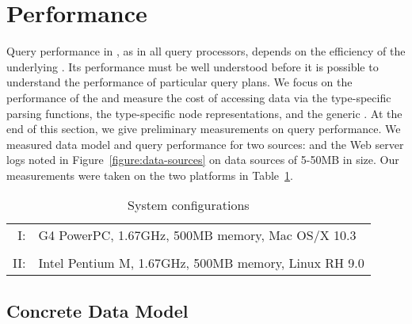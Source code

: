 \section{Performance}
\label{section:performance}

Query performance in \padx{}, as in all query processors, depends on
the efficiency of the underlying \condm{}.  Its performance must be
well understood before it is possible to understand the performance of
particular query plans. We focus on the performance of the \condm{}
and measure the cost of accessing data via the \pads{} type-specific parsing
functions, the \padx{} type-specific node representations, and the
generic \padx{} \condm{}.  At the end of this section, we give preliminary
measurements on query performance.  We measured data model and query
performance for two \pads{} sources: \dibbler{} and the Web server
logs noted in Figure~\ref{figure:data-sources} on data sources of
5-50MB in size.  Our measurements were taken on the
two platforms in Table~\ref{tab:config}. 
\begin{table}
\begin{center}
\begin{tabular}{rl}
I:  & G4 PowerPC, 1.67GHz, 500MB memory, Mac OS/X 10.3 \\ 
\\
II: & Intel Pentium M, 1.67GHz, 500MB memory, Linux RH 9.0 \\ 
\end{tabular}
\end{center}
\caption{System configurations}
\label{tab:config}
\end{table}

\subsection{Concrete Data Model} 



